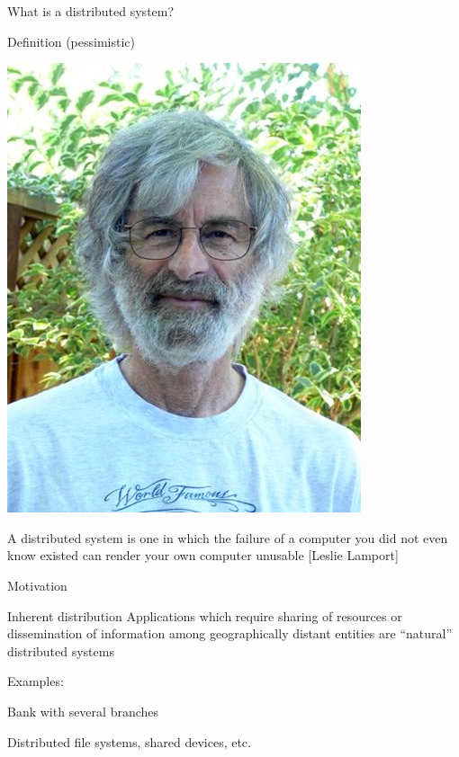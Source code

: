 \begin{frame}{What is a distributed system?}
\pause
\smallskip
\begin{block}{Definition (pessimistic)}
\begin{minipage}{0.15\textwidth}
\includegraphics[width=\textwidth]{figs/01/leslie.jpg}
\end{minipage}
\hfill
\begin{minipage}{0.80\textwidth}
A distributed system is one in which the failure of a computer you did not even know existed can render your own computer unusable [Leslie Lamport]
\end{minipage}
\end{block}

\end{frame}

\begin{frame}{Motivation}
\begin{block}{Inherent distribution}
Applications which require sharing of resources or dissemination of information among geographically
distant entities are “natural” distributed systems
\end{block}

\bigskip
Examples:
\BI
\item Bank with several branches
\item Distributed file systems, shared devices, etc.
\EI
\end{frame}

